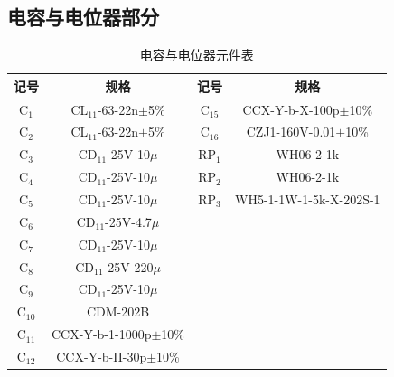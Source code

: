 \documentclass[12pt,UTF8]{ctexbook}
\begin{document}
	\subsection{电容与电位器部分}
	\begin{table}[H]
		\centering
		\small
		\setlength{\tabcolsep}{4pt}
		\caption{电容与电位器元件表}
		\begin{tabular}{|c|c||c|c|}
			\hline
			\textbf{记号} & \textbf{规格} & \textbf{记号} & \textbf{规格} \\ \hline
			C\(_1\) & CL\(_{11}\)-63-22n\(\pm\)5\% & C\(_{15}\) & CCX-Y-b-X-100p\(\pm\)10\% \\ \hline
			C\(_2\) & CL\(_{11}\)-63-22n\(\pm\)5\% & C\(_{16}\) & CZJ1-160V-0.01\(\pm\)10\% \\ \hline
			C\(_3\) & CD\(_{11}\)-25V-10\(\mu\) & RP\(_1\) & WH06-2-1k \\ \hline
			C\(_4\) & CD\(_{11}\)-25V-10\(\mu\) & RP\(_2\) & WH06-2-1k \\ \hline
			C\(_5\) & CD\(_{11}\)-25V-10\(\mu\) & RP\(_3\) & WH5-1-1W-1-5k-X-202S-1 \\ \hline
			C\(_6\) & CD\(_{11}\)-25V-4.7\(\mu\) & & \\ \hline
			C\(_7\) & CD\(_{11}\)-25V-10\(\mu\) & & \\ \hline
			C\(_8\) & CD\(_{11}\)-25V-220\(\mu\) & & \\ \hline
			C\(_9\) & CD\(_{11}\)-25V-10\(\mu\) & & \\ \hline
			C\(_{10}\) & CDM-202B & & \\ \hline
			C\(_{11}\) & CCX-Y-b-1-1000p\(\pm\)10\% & & \\ \hline
			C\(_{12}\) & CCX-Y-b-II-30p\(\pm\)10\% & & \\ \hline
		\end{tabular}
	\end{table}

\backmatter
\end{document}
